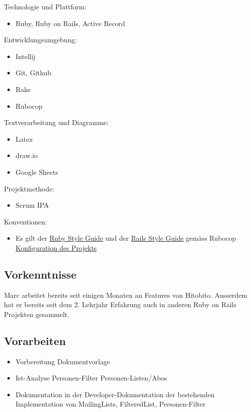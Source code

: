Technologie und Plattform:

\begin{itemize}
    \item Ruby, Ruby on Rails, Active Record
\end{itemize}

Entwicklungsumgebung:

\begin{itemize}
    \item Intellij
    \item Git, Github
    \item Rake
    \item Rubocop
\end{itemize}

Textverarbeitung und Diagramme:

\begin{itemize}
    \item Latex
    \item draw.io
    \item Google Sheets
\end{itemize}

Projektmethode:

\begin{itemize}
    \item Scrum IPA
\end{itemize}

Konventionen:

\begin{itemize}
    \item Es gilt der \href{https://github.com/rubocop-hq/ruby-style-guide}{Ruby Style Guide} und der \href{https://github.com/rubocop-hq/rails-style-guide}{Rails Style Guide} gemäss Rubocop \href{https://github.com/puzzle/cryptopus/blob/master/.rubocop.yml}{Konfiguration des Projekts}
\end{itemize}

\subsection{Vorkenntnisse}
Marc arbeitet bereits seit einigen Monaten an Features von Hitobito. Ausserdem hat er bereits seit dem 2. Lehrjahr Erfahrung auch in anderen Ruby on Rails Projekten gesammelt.

\subsection{Vorarbeiten}
\begin{itemize}
    \item Vorbereitung Dokumentvorlage
    \item Ist-Analyse Personen-Filter Personen-Listen/Abos
    \item Dokumentation in der Developer-Dokumentation der bestehenden Implementation von MailingLists, FilteredList, Personen-Filter
\end{itemize}

